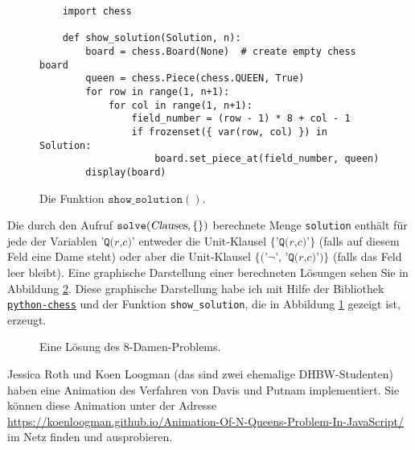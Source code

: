 \begin{figure}[!ht]
\centering
\begin{verbatim}
    import chess
                
    def show_solution(Solution, n):
        board = chess.Board(None)  # create empty chess board
        queen = chess.Piece(chess.QUEEN, True)
        for row in range(1, n+1):
            for col in range(1, n+1):
                field_number = (row - 1) * 8 + col - 1
                if frozenset({ var(row, col) }) in Solution:
                    board.set_piece_at(field_number, queen)
        display(board)        
\end{verbatim}
\vspace*{-0.3cm}
\caption{Die Funktion $\texttt{show\_solution}()$.}
\label{fig:printBoard}
\end{figure}



Die durch den Aufruf $\texttt{solve}(\textsl{Clauses}, \{\})$ 
berechnete Menge \texttt{solution} enthält für jede der Variablen $\texttt{'Q(}r\texttt{,}c\texttt{)'}$
entweder die Unit-Klausel $\{\texttt{'Q(}r\texttt{,}c\texttt{)'}\}$  (falls auf diesem Feld eine Dame steht) oder
aber die Unit-Klausel  $\{ \texttt{('¬', 'Q(}r\texttt{,}c\texttt{)')}\}$ (falls das Feld leer bleibt).
Eine graphische Darstellung einer berechneten Lösungen sehen Sie in Abbildung \ref{fig:8-queens.pdf}.
Diese graphische Darstellung habe ich mit Hilfe der Bibliothek
\href{https://python-chess.readthedocs.io/en/latest/}{\texttt{python-chess}} und der Funktion
\texttt{show\_solution}, die in Abbildung \ref{fig:printBoard} gezeigt ist, erzeugt.

\begin{figure}[!ht]
  \centering
  \caption{Eine Lösung des 8-Damen-Problems.}
  \label{fig:8-queens.pdf}
\end{figure}

Jessica Roth und Koen Loogman (das sind zwei ehemalige DHBW-Studenten) haben eine Animation des Verfahren von
Davis und Putnam implementiert.  Sie können diese Animation unter der Adresse
\\[0.2cm]
\hspace*{1.3cm}
\href{https://koenloogman.github.io/Animation-Of-N-Queens-Problem-In-JavaScript/}{https://koenloogman.github.io/Animation-Of-N-Queens-Problem-In-JavaScript/}
\\[0.2cm]
im Netz finden und ausprobieren.

